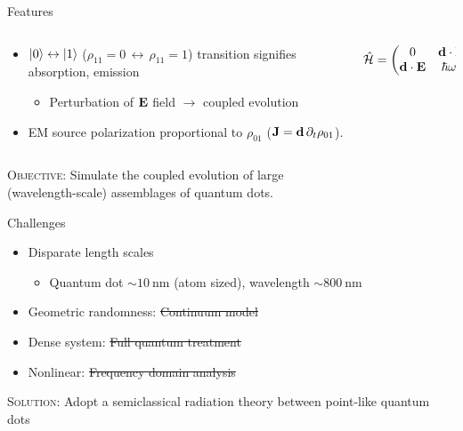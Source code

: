 \documentclass[aspectratio=169, usenames, dvipsnames]{beamer}
\begin{document}
\begin{frame}{Features}
  \begin{columns}[t]
    \begin{column}{0.75\textwidth}
      \begin{itemize}
        \item $\ket{0} \leftrightarrow \ket{1}$ ($\rho_{11} = 0 \, \leftrightarrow \, \rho_{11} = 1$) transition signifies absorption, \alert{emission}
          \begin{itemize}
            \item Perturbation of $\vb{E}$ field $\to$ coupled evolution
          \end{itemize}
        \item EM source polarization proportional to $\rho_{01}$ ($\vb{J} = \vb{d} \, \partial_t \rho_{01}$).
      \end{itemize}
    \end{column}
    \begin{column}{0.25\textwidth}
      \begin{gather*}
        \hat{\mathcal{H}} = \mqty( 0 & \vb{d} \cdot \vb{E} \\ \vb{d} \cdot \vb{E} & \hbar \omega_0)
      \end{gather*}
    \end{column}
  \end{columns}

  \vfill

  \begin{block}{\textsc{Objective}:}
    \centering
    Simulate the coupled evolution of large \\ (wavelength-scale) assemblages of quantum dots.
  \end{block}
\end{frame}

\begin{frame}{Challenges}
  \begin{itemize}
    \item Disparate length scales
      \begin{itemize}
        \item Quantum dot $\sim \SI{10}{\nano\meter}$ (atom sized), wavelength $\sim \SI{800}{\nano\meter}$
      \end{itemize}
    \item Geometric randomness: \sout{Continuum model}
    \item Dense system: \sout{Full quantum treatment}
    \item Nonlinear: \sout{Frequency domain analysis}
  \end{itemize}

  \vfill

  \begin{block}{\textsc{Solution}:}
    \centering
    Adopt a semiclassical radiation theory between point-like quantum dots
  \end{block}
\end{frame}
\end{document}
